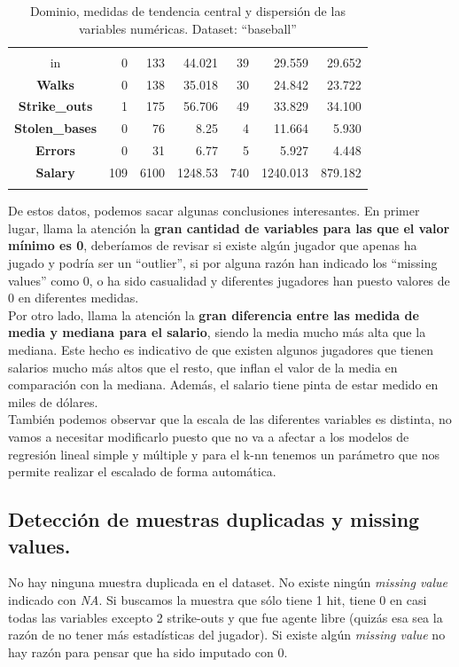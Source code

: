 \documentclass[a4paper,12pt, oneside]{book}
\begin{document}
\begin{longtable}{@{}c|rrrrrr@{}}
\textbf{\begin{tabular}[c]{@{}c@{}}Runs\_batted\_\\ in\end{tabular}} & 0 & 133 & 44.021 & 39 & 29.559 & 29.652 \\* \cmidrule(r){1-1}
\textbf{Walks} & 0 & 138 & 35.018 & 30 & 24.842 & 23.722 \\* \cmidrule(r){1-1}
\textbf{Strike\_outs} & 1 & 175 & 56.706 & 49 & 33.829 & 34.100 \\* \cmidrule(r){1-1}
\textbf{Stolen\_bases} & 0 & 76 & 8.25 & 4 & 11.664 & 5.930 \\* \cmidrule(r){1-1}
\textbf{Errors} & 0 & 31 & 6.77 & 5 & 5.927 & 4.448 \\* \cmidrule(r){1-1}
\textbf{Salary} & 109 & 6100 & 1248.53 & 740 & 1240.013 & 879.182 \\* \bottomrule
\caption{Dominio, medidas de tendencia central y dispersión de las variables numéricas. Dataset: ``baseball''}
\label{tab:tablamedidas}\\
\end{longtable}

De estos datos, podemos sacar algunas conclusiones interesantes. En primer lugar, llama la atención la \textbf{gran cantidad de variables para las que el valor mínimo es 0}, deberíamos de revisar si existe algún jugador que apenas ha jugado y podría ser un ``outlier'', si por alguna razón han indicado los ``missing values'' como 0, o ha sido casualidad y diferentes jugadores han puesto valores de 0 en diferentes medidas. \\

Por otro lado, llama la atención la \textbf{gran diferencia entre las medida de media y mediana para el salario}, siendo la media mucho más alta que la mediana. Este hecho es indicativo de que existen algunos jugadores que tienen salarios mucho más altos que el resto, que inflan el valor de la media en comparación con la mediana. Además, el salario tiene pinta de estar medido en miles de dólares. \\

También podemos observar que la escala de las diferentes variables es distinta, no vamos a necesitar modificarlo puesto que no va a afectar a los modelos de regresión lineal simple y múltiple y para el k-nn tenemos un parámetro que nos permite realizar el escalado de forma automática. \\

\subsection{Detección de muestras duplicadas y missing values.}
No hay ninguna muestra duplicada en el dataset. No existe ningún \textit{missing value} indicado con \textit{NA}. Si buscamos la muestra que sólo tiene 1 hit, tiene 0 en casi todas las variables excepto 2 strike-outs y que fue agente libre (quizás esa sea la razón de no tener más estadísticas del jugador). Si existe algún \textit{missing value} no hay razón para pensar que ha sido imputado con 0.
\end{document}
